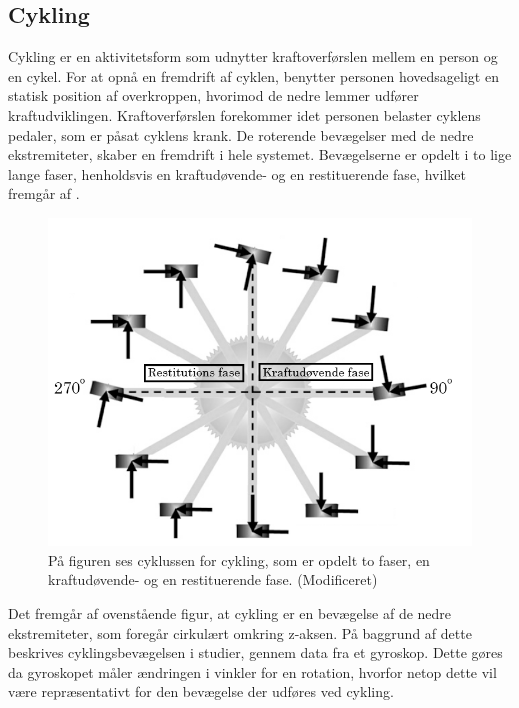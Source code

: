 \subsection{Cykling}
Cykling er en aktivitetsform som udnytter kraftoverførslen mellem en person og en cykel. For at opnå en fremdrift af cyklen, benytter personen hovedsageligt en statisk position af overkroppen, hvorimod de nedre lemmer udfører kraftudviklingen. \citep{Springer2014} \newline 
Kraftoverførslen forekommer idet personen belaster cyklens pedaler, som er påsat cyklens krank. De roterende bevægelser med de nedre ekstremiteter, skaber en fremdrift i hele systemet. Bevægelserne er opdelt i to lige lange faser, henholdsvis en kraftudøvende- og en restituerende fase, hvilket fremgår af .

\begin{figure}[H]
	\centering
	\includegraphics[scale=0.5]{figures/bProblemloesning/cykel_cyklus.png}
	\caption{På figuren ses cyklussen for cykling, som er opdelt to faser, en kraftudøvende- og en restituerende fase. \citep{Springer2014} (Modificeret)}
	\label{fig:cykel_cyklus}
\end{figure}

Det fremgår af ovenstående figur, at cykling er en bevægelse af de nedre ekstremiteter, som foregår cirkulært omkring z-aksen. På baggrund af dette beskrives cyklingsbevægelsen i studier, gennem data fra et gyroskop. Dette gøres da gyroskopet måler ændringen i vinkler for en rotation, hvorfor netop dette vil være repræsentativt for den bevægelse der udføres ved cykling. \citep{Cockcroft2011,Marin-PerianuMarin-Perianu2013}


